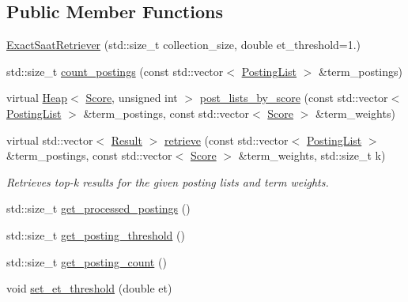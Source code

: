 \subsection*{Public Member Functions}
\begin{DoxyCompactItemize}
\item 
\hyperlink{classbloodhound_1_1query_1_1ExactSaatRetriever_a50c5c53b4b7aff76e4eabf040219be52}{Exact\+Saat\+Retriever} (std\+::size\+\_\+t collection\+\_\+size, double et\+\_\+threshold=1.)
\item 
std\+::size\+\_\+t \hyperlink{classbloodhound_1_1query_1_1ExactSaatRetriever_a21f4192190392fee8d8b12b99c6bbe0e}{count\+\_\+postings} (const std\+::vector$<$ \hyperlink{classbloodhound_1_1PostingList}{Posting\+List} $>$ \&term\+\_\+postings)
\item 
virtual \hyperlink{classbloodhound_1_1Heap}{Heap}$<$ \hyperlink{structbloodhound_1_1Score}{Score}, unsigned int $>$ \hyperlink{classbloodhound_1_1query_1_1ExactSaatRetriever_aeadc34f7b5116c79d723cb39e673c6ff}{post\+\_\+lists\+\_\+by\+\_\+score} (const std\+::vector$<$ \hyperlink{classbloodhound_1_1PostingList}{Posting\+List} $>$ \&term\+\_\+postings, const std\+::vector$<$ \hyperlink{structbloodhound_1_1Score}{Score} $>$ \&term\+\_\+weights)
\item 
virtual std\+::vector$<$ \hyperlink{structbloodhound_1_1query_1_1Result}{Result} $>$ \hyperlink{classbloodhound_1_1query_1_1ExactSaatRetriever_aced2763cc2a4c12838fef4a20759049e}{retrieve} (const std\+::vector$<$ \hyperlink{classbloodhound_1_1PostingList}{Posting\+List} $>$ \&term\+\_\+postings, const std\+::vector$<$ \hyperlink{structbloodhound_1_1Score}{Score} $>$ \&term\+\_\+weights, std\+::size\+\_\+t k)
\begin{DoxyCompactList}\small\item\em Retrieves top-\/k results for the given posting lists and term weights. \end{DoxyCompactList}\item 
std\+::size\+\_\+t \hyperlink{classbloodhound_1_1query_1_1ExactSaatRetriever_a1cf3c5e50a72880e1eb8d995ff22b20a}{get\+\_\+processed\+\_\+postings} ()
\item 
std\+::size\+\_\+t \hyperlink{classbloodhound_1_1query_1_1ExactSaatRetriever_a5d3a882f8f117130a4be46e711397e3c}{get\+\_\+posting\+\_\+threshold} ()
\item 
std\+::size\+\_\+t \hyperlink{classbloodhound_1_1query_1_1ExactSaatRetriever_a43b6bd8cdc3a64c5eabf778230c53419}{get\+\_\+posting\+\_\+count} ()
\item 
void \hyperlink{classbloodhound_1_1query_1_1ExactSaatRetriever_a78016cfffe921ed440dec62c6f82f4cc}{set\+\_\+et\+\_\+threshold} (double et)
\end{DoxyCompactItemize}
